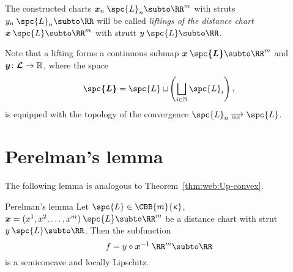 The constructed charts $\bm{x}_n\:\spc{L}_n\subto\RR^m$ with struts $y_n\:\spc{L}_n\subto\RR$ 
will be called 
\emph{liftings of the distance chart}%
$\bm{x}\:\spc{L}\subto\RR^m$ with strutt $y\:\spc{L}\subto\RR$.

Note that a lifting forms a continuous submap 
$\bm{x}\:\bm{\spc{L}}\subto\RR^m$ and $\bm{y}\:\bm{\spc{L}}\to\RR$, where the space
$$\bm{\spc{L}}=\spc{L}\sqcup\l(\bigsqcup_{i\in\NN}\spc{L}_i\r),$$
is equipped with the topology of the convergence $\spc{L}_n\GHto\spc{L}$.


\section{Perelman's lemma}\label{sec:perelman-lemma}

The following lemma is analogous to Theorem~\ref{thm:web:Up-convex}.

\begin{thm}{Perelman's lemma}\label{thm:inverse-function:concave}
Let $\spc{L}\in\CBB{m}{\kappa}$,
$\bm{x}=(x^1,x^2,\dots,x^m)\:\spc{L}\subto \RR^m$ be a distance  chart with strut $y\:\spc{L}\subto \RR$.
Then the subfunction 
\[f=y\circ\bm{x}^{-1}\:\RR^m\subto \RR\] 
is a semiconcave and locally Lipschitz.
\end{thm}

